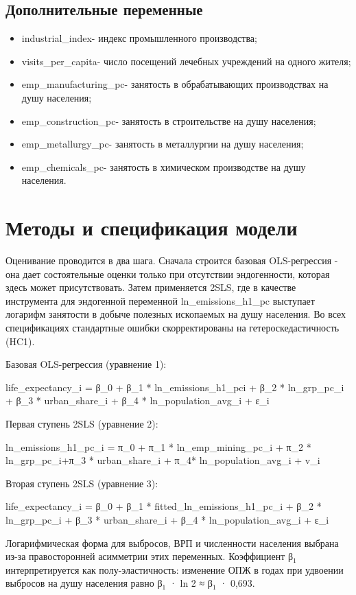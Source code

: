 \documentclass[11pt,a4paper]{article}
\begin{document}
\subsection*{Дополнительные переменные}
\begin{itemize}
\item industrial\_index- индекс промышленного производства;
\item visits\_per\_capita- число посещений лечебных учреждений на одного жителя;
\item emp\_manufacturing\_pc- занятость в обрабатывающих производствах на душу населения;
\item emp\_construction\_pc- занятость в строительстве на душу населения;
\item emp\_metallurgy\_pc- занятость в металлургии на душу населения;
\item emp\_chemicals\_pc- занятость в химическом производстве на душу населения.
\end{itemize}

\section*{Методы и спецификация модели}
Оценивание проводится в два шага. Сначала строится базовая OLS-регрессия - она дает состоятельные оценки только при отсутствии эндогенности, которая здесь может присутствовать. Затем применяется 2SLS, где в качестве инструмента для эндогенной переменной ln\_emissions\_h1\_pc выступает логарифм занятости в добыче полезных ископаемых на душу населения. Во всех спецификациях стандартные ошибки скорректированы на гетероскедастичность (HC1).

Базовая OLS-регрессия (уравнение 1):

\begin{center}\small life\_expectancy\_i = β\_0 + β\_1 * ln\_emissions\_h1\_pci + β\_2 * ln\_grp\_pc\_i + β\_3 * urban\_share\_i + β\_4 * ln\_population\_avg\_i + ε\_i\end{center}
Первая ступень 2SLS (уравнение 2):

\begin{center}\small ln\_emissions\_h1\_pc\_i = π\_0 + π\_1 * ln\_emp\_mining\_pc\_i + π\_2 * ln\_grp\_pc\_i+π\_3 * urban\_share\_i + π\_4* ln\_population\_avg\_i + v\_i\end{center}
Вторая ступень 2SLS (уравнение 3):

\begin{center}\small life\_expectancy\_i = β\_0 + β\_1 * fitted\_ln\_emissions\_h1\_pc\_i + β\_2 * ln\_grp\_pc\_i + β\_3 * urban\_share\_i + β\_4 * ln\_population\_avg\_i + ε\_i\end{center}
Логарифмическая форма для выбросов, ВРП и численности населения выбрана из-за правосторонней асимметрии этих переменных. Коэффициент β$_1$ интерпретируется как полу-эластичность: изменение ОПЖ в годах при удвоении выбросов на душу населения равно β$_1$ · ln 2 ≈ β$_1$ · 0,693.
\end{document}
